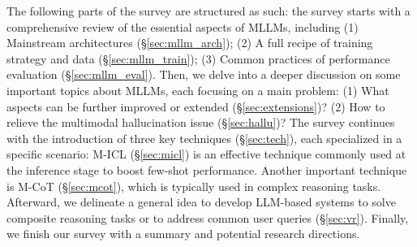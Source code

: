 The following parts of the survey are structured as such: the survey starts with a comprehensive review of the essential aspects of MLLMs, including 
(1) Mainstream architectures (\S \ref{sec:mllm_arch});
(2) A full recipe of training strategy and data (\S \ref{sec:mllm_train}); (3) Common practices of performance evaluation (\S \ref{sec:mllm_eval}). 
Then, we delve into a deeper discussion on some important topics about MLLMs, each focusing on a main problem: (1) What aspects can be further improved or extended (\S \ref{sec:extensions})? (2) How to relieve the multimodal hallucination issue (\S \ref{sec:hallu})?
The survey continues with the introduction of three key techniques (\S \ref{sec:tech}), each specialized in a specific scenario: M-ICL (\S \ref{sec:micl}) is an effective technique commonly used at the inference stage to boost few-shot performance. Another important technique is M-CoT (\S \ref{sec:mcot}), which is typically used in complex reasoning tasks. Afterward, we delineate a general idea to develop LLM-based systems to solve composite reasoning tasks or to address common user queries (\S \ref{sec:vr}).
Finally, we finish our survey with a summary and potential research directions.







